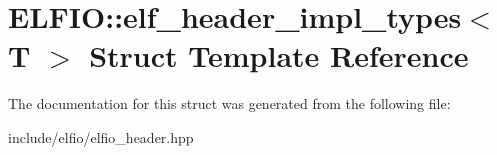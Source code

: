 \hypertarget{struct_e_l_f_i_o_1_1elf__header__impl__types}{}\section{E\+L\+F\+IO\+:\+:elf\+\_\+header\+\_\+impl\+\_\+types$<$ T $>$ Struct Template Reference}
\label{struct_e_l_f_i_o_1_1elf__header__impl__types}


The documentation for this struct was generated from the following file\+:\begin{DoxyCompactItemize}
\item 
include/elfio/elfio\+\_\+header.\+hpp\end{DoxyCompactItemize}
